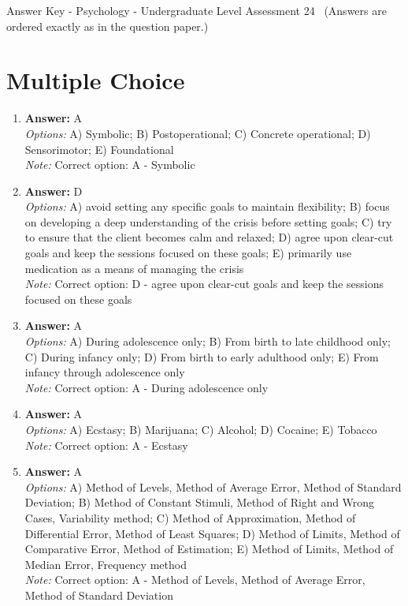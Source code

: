 \documentclass[12pt]{article}
\begin{document}
\begin{center}
Answer Key - Psychology - Undergraduate Level Assessment 24 \
\small (Answers are ordered exactly as in the question paper.)
\end{center}

\section*{Multiple Choice}
\begin{enumerate}[label=\arabic*.]
\item \textbf{Answer:} A
\\ \textit{Options:} A) Symbolic; B) Postoperational; C) Concrete operational; D) Sensorimotor; E) Foundational
\\ \textit{Note:} Correct option: A - Symbolic
\item \textbf{Answer:} D
\\ \textit{Options:} A) avoid setting any specific goals to maintain flexibility; B) focus on developing a deep understanding of the crisis before setting goals; C) try to ensure that the client becomes calm and relaxed; D) agree upon clear-cut goals and keep the sessions focused on these goals; E) primarily use medication as a means of managing the crisis
\\ \textit{Note:} Correct option: D - agree upon clear-cut goals and keep the sessions focused on these goals
\item \textbf{Answer:} A
\\ \textit{Options:} A) During adolescence only; B) From birth to late childhood only; C) During infancy only; D) From birth to early adulthood only; E) From infancy through adolescence only
\\ \textit{Note:} Correct option: A - During adolescence only
\item \textbf{Answer:} A
\\ \textit{Options:} A) Ecstasy; B) Marijuana; C) Alcohol; D) Cocaine; E) Tobacco
\\ \textit{Note:} Correct option: A - Ecstasy
\item \textbf{Answer:} A
\\ \textit{Options:} A) Method of Levels, Method of Average Error, Method of Standard Deviation; B) Method of Constant Stimuli, Method of Right and Wrong Cases, Variability method; C) Method of Approximation, Method of Differential Error, Method of Least Squares; D) Method of Limits, Method of Comparative Error, Method of Estimation; E) Method of Limits, Method of Median Error, Frequency method
\\ \textit{Note:} Correct option: A - Method of Levels, Method of Average Error, Method of Standard Deviation
\end{enumerate}
\end{document}
